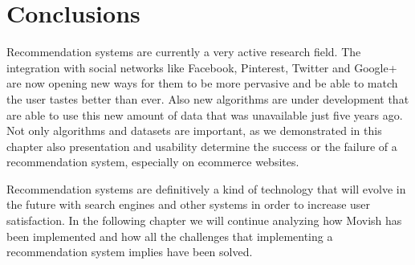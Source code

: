 \section{Conclusions}
\label{sec:overview_conclusions}

Recommendation systems are currently a very active research field. The integration with social networks like Facebook, Pinterest, Twitter and Google+ are now opening new ways for them to be more pervasive and be able to match the user tastes better than ever. Also new algorithms are under development that are able to use this new amount of data that was unavailable just five years ago. Not only algorithms and datasets are important, as we demonstrated in this chapter also presentation and usability determine the success or the failure of a recommendation system, especially on ecommerce websites.

Recommendation systems are definitively a kind of technology that will evolve in the future with search engines and other systems in order to increase user satisfaction. In the following chapter we will continue analyzing how Movish has been implemented and how all the challenges that implementing a recommendation system implies have been solved.

\acresetall